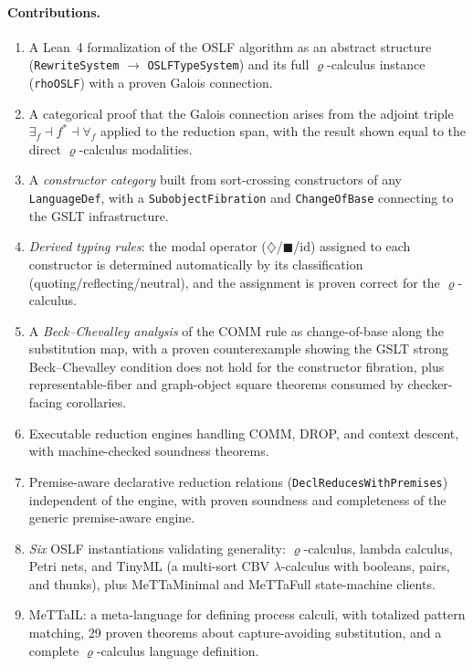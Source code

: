 \documentclass[]{article}
\newcommand{\code}[1]{\texttt{#1}}
\newcommand{\rhocalc}{\ensuremath{\varrho}}
\newcommand{\Dia}{\ensuremath{\diamondsuit}}
\newcommand{\Bx}{\ensuremath{\blacksquare}}
\newcommand{\OSLF}{\textup{OSLF}}
\newcommand{\MeTTaIL}{\textup{MeTTaIL}}
\begin{document}
\paragraph{Contributions.}
\begin{enumerate}
\item A Lean~4 formalization of the \OSLF{} algorithm as an abstract structure
  (\code{RewriteSystem} $\to$ \code{OSLFTypeSystem}) and its full \rhocalc{}-calculus
  instance (\code{rhoOSLF}) with a proven Galois connection.
\item A categorical proof that the Galois connection arises from the adjoint triple
  $\exists_f \dashv f^* \dashv \forall_f$ applied to the reduction span, with the
  result shown equal to the direct \rhocalc{}-calculus modalities.
\item A \emph{constructor category} built from sort-crossing constructors of any
  \code{LanguageDef}, with a \code{SubobjectFibration} and \code{ChangeOfBase}
  connecting to the GSLT infrastructure.
\item \emph{Derived typing rules}: the modal operator ($\Dia$/$\Bx$/id) assigned to
  each constructor is determined automatically by its classification
  (quoting/reflecting/neutral), and the assignment is proven correct for the
  \rhocalc{}-calculus.
\item A \emph{Beck--Chevalley analysis} of the COMM rule as change-of-base along the
  substitution map, with a proven counterexample showing the GSLT strong
  Beck--Chevalley condition does not hold for the constructor fibration, plus
  representable-fiber and graph-object square theorems consumed by checker-facing
  corollaries.
\item Executable reduction engines handling COMM, DROP, and context descent, with
  machine-checked soundness theorems.
\item Premise-aware declarative reduction relations
  (\code{DeclReducesWithPremises}) independent of the engine, with proven
  soundness and completeness of the generic premise-aware engine.
\item \emph{Six} \OSLF{} instantiations validating generality:
  \rhocalc{}-calculus, lambda calculus, Petri nets, and TinyML (a multi-sort CBV
  $\lambda$-calculus with booleans, pairs, and thunks), plus MeTTaMinimal and
  MeTTaFull state-machine clients.
\item \MeTTaIL{}: a meta-language for defining process calculi, with totalized pattern
  matching, 29 proven theorems about capture-avoiding substitution, and a complete
  \rhocalc{}-calculus language definition.

\end{enumerate}
\end{document}
